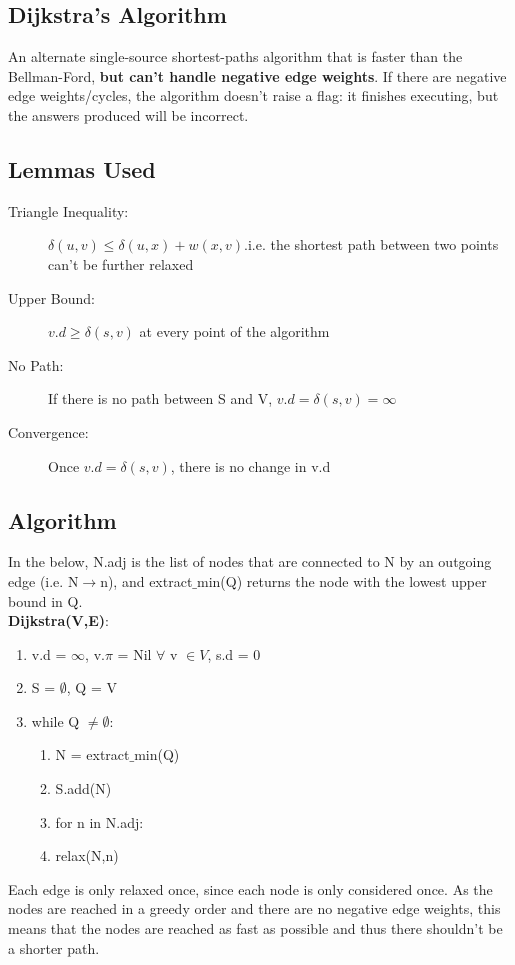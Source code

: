 \subsection{Dijkstra's Algorithm}
An alternate single-source shortest-paths algorithm that is faster than the Bellman-Ford, \textbf{but can't handle negative edge weights}. If there are negative edge weights/cycles, the algorithm doesn't raise a flag: it finishes executing, but the answers produced will be incorrect. 

\subsection{Lemmas Used}
\begin{description}
    \item [Triangle Inequality:] \(\delta(u,v) \leq \delta(u,x) + w(x,v)\).i.e. the shortest path between two points can't be further relaxed
    \item [Upper Bound:] \(v.d \geq \delta (s,v) \) at every point of the algorithm
    \item [No Path:] If there is no path between S and V, $v.d=\delta(s,v)=\infty$
    \item [Convergence:] Once \(v.d = \delta (s,v)\), there is no change in v.d
\end{description}

\subsection{Algorithm}
In the below, N.adj is the list of nodes that are connected to N by an outgoing edge (i.e. N$\rightarrow$n), and extract$\_$min(Q) returns the node with the lowest upper bound in Q.\\
\textbf{Dijkstra(V,E)}:
\begin{enumerate}[label=\Alph*]
    \item v.d = $\infty$, v.$\pi$ = Nil $\forall$ v $\in V$, s.d = 0
    \item S = $\emptyset$, Q = V 
    \item while Q $\neq\emptyset $: 
\begin{enumerate}[label=\arabic*]
    \item N = extract$\_$min(Q)
    \item S.add(N)
    \item for n in N.adj:
    \item [] \quad relax(N,n)
\end{enumerate}  
\end{enumerate}
Each edge is only relaxed once, since each node is only considered once. As the nodes are reached in a greedy order and there are no negative edge weights, this means that the nodes are reached as fast as possible and thus there shouldn't be a shorter path.

